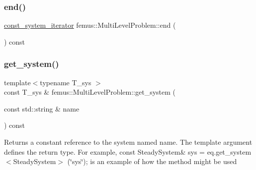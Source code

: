 \mbox{\label{classfemus_1_1_multi_level_problem_a1e4f29a2bd285914e27e6cbad41129a9}} 
\subsubsection{\texorpdfstring{end()}{end()}\hspace{0.1cm}{\footnotesize\ttfamily [2/2]}}
{\footnotesize\ttfamily \mbox{\hyperlink{classfemus_1_1_multi_level_problem_a8bf081f150a9e5685fc9281fc1dccd16}{const\+\_\+system\+\_\+iterator}} femus\+::\+Multi\+Level\+Problem\+::end (\begin{DoxyParamCaption}{ }\end{DoxyParamCaption}) const\hspace{0.3cm}{\ttfamily [inline]}}

\mbox{\label{classfemus_1_1_multi_level_problem_a3d90edba93be2c202ea2bf8e87e20854}} 
\subsubsection{\texorpdfstring{get\+\_\+system()}{get\_system()}\hspace{0.1cm}{\footnotesize\ttfamily [1/8]}}
{\footnotesize\ttfamily template$<$typename T\+\_\+sys $>$ \\
const T\+\_\+sys \& femus\+::\+Multi\+Level\+Problem\+::get\+\_\+system (\begin{DoxyParamCaption}\item[{const std\+::string \&}]{name }\end{DoxyParamCaption}) const\hspace{0.3cm}{\ttfamily [inline]}}

\begin{DoxyReturn}{Returns}
a constant reference to the system named {\ttfamily name}. The template argument defines the return type. For example, const Steady\+System\& sys = eq.\+get\+\_\+system$<$\+Steady\+System$>$ (\char`\"{}sys\char`\"{}); is an example of how the method might be used 
\end{DoxyReturn}
\mbox{\label{classfemus_1_1_multi_level_problem_a7412d0cf202758b1477f4b75f76208aa}} 
